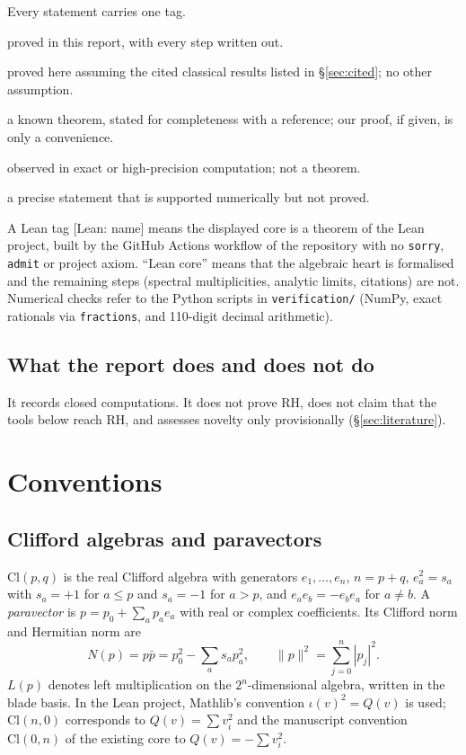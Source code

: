 \documentclass[11pt]{amsart}
\theoremstyle{plain}
\theoremstyle{definition}
\newcommand{\Cl}{\mathrm{Cl}}
\newcommand{\status}[1]{\textsc{[#1]}}
\newcommand{\leanus}{\textunderscore\allowbreak}
\newcommand{\lean}[1]{{\ttfamily\let\_\leanus #1}}
\begin{document}
Every statement carries one tag.
\begin{description}[leftmargin=2.8cm,style=nextline]
\item[\status{Closed}] proved in this report, with every step written out.
\item[\status{Closed-cond}] proved here assuming the cited classical results listed in \S\ref{sec:cited}; no other assumption.
\item[\status{Classical}] a known theorem, stated for completeness with a reference; our proof, if given, is only a convenience.
\item[\status{Numerical}] observed in exact or high-precision computation; not a theorem.
\item[\status{Conjecture}] a precise statement that is supported numerically but not proved.
\end{description}
A Lean tag \lean{[Lean: name]} means the displayed core is a theorem of the
Lean project, built by the GitHub Actions workflow of the repository with no
\texttt{sorry}, \texttt{admit} or project axiom. ``Lean core'' means that the
algebraic heart is formalised and the remaining steps (spectral multiplicities,
analytic limits, citations) are not. Numerical checks refer to the Python
scripts in \texttt{verification/} (NumPy, exact rationals via
\texttt{fractions}, and 110-digit decimal arithmetic).

\subsection*{What the report does and does not do}
It records closed computations. It does not prove RH, does not claim that the
tools below reach RH, and assesses novelty only provisionally
(\S\ref{sec:literature}).

\section{Conventions}

\subsection{Clifford algebras and paravectors}
$\Cl(p,q)$ is the real Clifford algebra with generators $e_1,\dots,e_n$,
$n=p+q$, $e_a^2=s_a$ with $s_a=+1$ for $a\le p$ and $s_a=-1$ for $a>p$, and
$e_ae_b=-e_be_a$ for $a\ne b$. A \emph{paravector} is
$p=p_0+\sum_a p_ae_a$ with real or complex coefficients. Its Clifford norm and
Hermitian norm are
\[
N(p)=p\bar p=p_0^2-\sum_a s_a p_a^2,\qquad \|p\|^2=\sum_{j=0}^n |p_j|^2 .
\]
$L(p)$ denotes left multiplication on the $2^n$-dimensional algebra, written in
the blade basis. In the Lean project, Mathlib's convention $\iota(v)^2=Q(v)$ is
used; $\Cl(n,0)$ corresponds to $Q(v)=\sum v_i^2$ and the manuscript convention
$\Cl(0,n)$ of the existing core to $Q(v)=-\sum v_i^2$.
\end{document}
